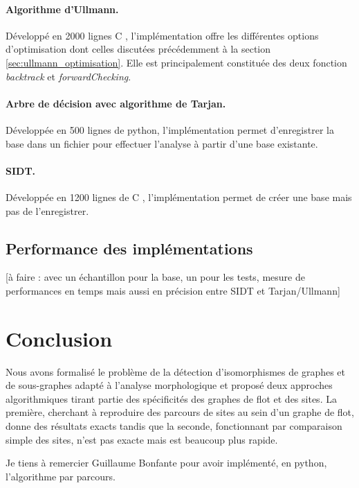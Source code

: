 \paragraph{Algorithme d'Ullmann.}
Développé en 2000 lignes C \cite{graphbinalgo}, l'implémentation offre les différentes options d'optimisation dont celles discutées précédemment à la section \ref{sec:ullmann_optimisation}.
Elle est principalement constituée des deux fonction \emph{backtrack} et \emph{forwardChecking}.

\paragraph{Arbre de décision avec algorithme de Tarjan.}
Développée en 500 lignes de python, l'implémentation permet d'enregistrer la base dans un fichier pour effectuer l'analyse à partir d'une base existante.

\paragraph{SIDT.}
Développée en 1200 lignes de C \cite{SIDT}, l’implémentation permet de créer une base mais pas de l'enregistrer.

\subsection{Performance des implémentations}
[à faire : avec un échantillon pour la base, un pour les tests, mesure de performances en temps mais aussi en précision entre SIDT et Tarjan/Ullmann]

\section{Conclusion}
Nous avons formalisé le problème de la détection d'isomorphismes de graphes et de sous-graphes adapté à l'analyse morphologique et proposé deux approches algorithmiques tirant partie des spécificités des graphes de flot et des sites.
La première, cherchant à reproduire des parcours de sites au sein d'un graphe de flot, donne des résultats exacts tandis que la seconde, fonctionnant par comparaison simple des sites, n'est pas exacte mais est beaucoup plus rapide.

Je tiens à remercier Guillaume Bonfante pour avoir implémenté, en python, l'algorithme par parcours.
